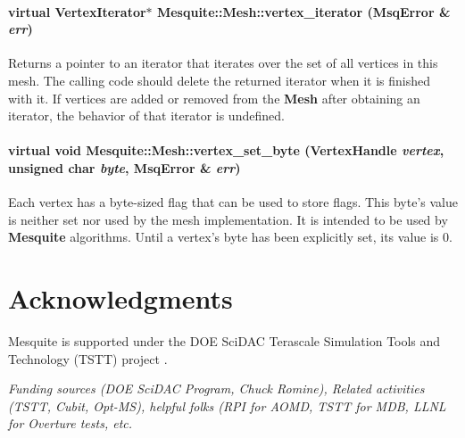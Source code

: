 \documentclass[letter]{report}
\begin{document}
\subsubsection{\setlength{\rightskip}{0pt plus 5cm}virtual Vertex\-Iterator$\ast$ Mesquite::Mesh::vertex\_\-iterator ({\bf Msq\-Error} \& {\em err})\hspace{0.3cm}{\tt  [pure virtual]}}\label{classMesquite_1_1Mesh_a5}


Returns a pointer to an iterator that iterates over the set of all vertices in this mesh. The calling code should delete the returned iterator when it is finished with it. If vertices are added or removed from the {\bf Mesh} after obtaining an iterator, the behavior of that iterator is undefined. 

\subsubsection{\setlength{\rightskip}{0pt plus 5cm}virtual void Mesquite::Mesh::vertex\_\-set\_\-byte (Vertex\-Handle {\em vertex}, unsigned char {\em byte}, {\bf Msq\-Error} \& {\em err})\hspace{0.3cm}{\tt  [pure virtual]}}\label{classMesquite_1_1Mesh_a11}


Each vertex has a byte-sized flag that can be used to store flags. This byte's value is neither set nor used by the mesh implementation. It is intended to be used by {\bf Mesquite} algorithms. Until a vertex's byte has been explicitly set, its value is 0. 


\chapter{Acknowledgments}

Mesquite is supported under the DOE SciDAC Terascale Simulation 
Tools and Technology (TSTT) project \cite{tstt}.  

{\it Funding sources (DOE SciDAC Program, Chuck Romine), Related activities
(TSTT, Cubit, Opt-MS), helpful folks (RPI for AOMD, TSTT for MDB, LLNL
for Overture tests, etc.}




\end{document}
